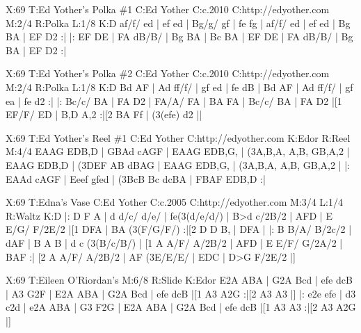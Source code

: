 \documentclass{article}
\begin{document}
\begin{abc}[name]
X:69
T:Ed Yother's Polka \#1
C:Ed Yother
C:c.2010
C:http://edyother.com
M:2/4
R:Polka
L:1/8
K:D
af/f/ ed | ef ed | Bg/g/ gf | fe fg |
af/f/ ed | ef ed | Bg BA | EF D2 :|
|: EF DE | FA dB/B/ | Bg BA | Bc BA |
EF DE | FA dB/B/ | Bg BA | EF D2 :|
\end{abc}

\begin{abc}[name]
X:69
T:Ed Yother's Polka \#2
C:Ed Yother
C:c.2010
C:http://edyother.com
M:2/4
R:Polka
L:1/8
K:D
Bd AF | Ad ff/f/ | gf ed | fe dB |
Bd AF | Ad ff/f/ | gf ea | fe d2 :|
|: Bc/c/ BA | FA D2 | FA/A/ FA | BA FA |
Bc/c/ BA | FA D2 |[1 EF/F/ ED | B,D A,2 :|[2 BA Ff | (3(efe) d2 ||
\end{abc}

\begin{abc}[name]
X:69
T:Ed Yother's Reel \#1
C:Ed Yother
C:http://edyother.com
K:Edor
R:Reel
M:4/4
EAAG EDB,D | GBAd cAGF | EAAG EDB,G, | (3A,B,A, A,B, GB,A,2 |
EAAG EDB,D | (3DEF AB dBAG | EAAG EDB,G, | (3A,B,A, A,B, GB,A,2 |
|:  EAAd cAGF | Eeef gfed | (3BcB Bc dcBA | FBAF EDB,D :|
\end{abc}

\begin{abc}[name]
X:69
T:Edna's Vase
C:Ed Yother
C:c.2005
C:http://edyother.com
M:3/4
L:1/4
R:Waltz
K:D
|:  D F A | d d/c/ d/e/ | fe(3(d/e/d/) |  B>d c/2B/2 |
 AFD | E E/G/ F/2E/2 |[1  DFA | BA (3(F/G/F/) :|[2  D D B, |  DFA |
|:  B B/A/ B/2c/2 | dAF | B A B | d c (3(B/c/B/) |
[1 A A/F/ A/2B/2 | AFD | E E/F/ G/2A/2 | BAF :|
[2 A A/F/ A/2B/2 | AF (3E/E/E/ |  EDC |  D>G F/2E/2 |]
\end{abc}

\begin{abc}[name]
X:69
T:Eileen O'Riordan's
M:6/8
R:Slide
K:Edor
E2A ABA | G2A Bcd | efe dcB | A3 G2F |
E2A ABA | G2A Bcd | efe dcB |[1 A3 A2G :|[2 A3 A3 |]
|: e2e efe | d3 c2d | e2A ABA | G3 F2G |
E2A ABA | G2A Bcd | efe dcB |[1 A3 A3 :|[2 A3 A2G |]
\end{abc}
\end{document}

